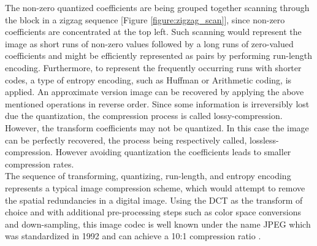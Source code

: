 \documentclass[a4paper,11pt,oneside]{article}
\begin{document}
The non-zero quantized coefficients are being grouped together scanning through the block in a zigzag sequence [Figure \ref{figure:zigzag_scan}], since non-zero coefficients are concentrated at the top left. Such scanning would represent the image as short runs of non-zero values followed by a long runs of zero-valued coefficients and might be efficiently represented as pairs by performing run-length encoding. Furthermore, to represent the frequently occurring runs with shorter codes, a type of entropy encoding, such as Huffman or Arithmetic coding, is applied.
An approximate version image can be recovered by applying the above mentioned operations in reverse order. Since some information is irreversibly lost due the quantization, the compression process is called lossy-compression. However, the transform coefficients may not be quantized. In this case the image can be perfectly recovered, the process being respectively called, lossless-compression. However avoiding quantization the coefficients leads to smaller compression rates. \\

\indent The sequence of transforming, quantizing, run-length, and entropy encoding represents a typical image compression scheme, which would attempt to remove the spatial redundancies in a digital image. Using the DCT as the transform of choice and with additional pre-processing steps such as color space conversions and down-sampling, this image codec is well known under the name JPEG which was standardized in 1992 and can achieve a 10:1 compression ratio \cite{jpeg_nasa}. \\
\end{document}
